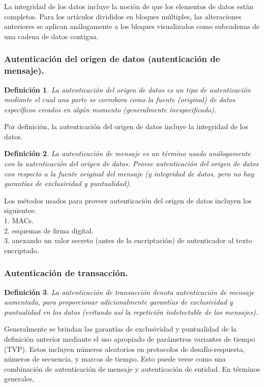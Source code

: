 \documentclass[a4paper, 12pt]{article} %
\newtheorem*{mydef1}{Definición} %
\begin{document}
La integridad de los datos incluye la noción de que los elementos de datos están completos. Para los artículos
divididos en bloques múltiples, las alteraciones anteriores se aplican análogamente a los bloques visualizados
como subcadenas de una cadena de datos contigua.

\subsubsection{Autenticación del origen de datos (autenticación de mensaje).}

\begin{mydef1}
La \textit{autenticación del origen de datos} es un tipo de autenticación mediante el cual una parte se corrobora
como la fuente (original) de datos específicos creados en algún momento (generalmente inespecificado).
\end{mydef1}

Por definición, la autenticación del origen de datos incluye la integridad de los datos.

\begin{mydef1}
La \textit{autenticación de mensaje} es un término usado análogamente con la autenticación del origen de datos.
Provee autenticación del origen de datos con respecto a la fuente original del mensaje (y integridad de datos,
pero no hay garantías de exclusividad y puntualidad).
\end{mydef1}

Los métodos usados para proveer autenticación del origen de datos incluyen los siguientes:\\
1. MACs.\\
2. esquemas de firma digital.\\
3. anexando un valor secreto (antes de la encriptación) de autenticador al texto encriptado.

\subsubsection{Autenticación de transacción.}

\begin{mydef1}
La \textit{autenticación de transacción} denota autenticación de mensaje aumentada, para proporcionar adicionalmente
garantías de exclusividad y puntualidad en los datos (evitando así la repetición indetectable de los mensajes).
\end{mydef1}

\newpage
Generalmente se brindan las garantías de exclusividad y puntualidad de la definición anterior mediante el uso
apropiado de parámetros variantes de tiempo (TVP). Estos incluyen números aleatorios en protocolos de
desafío-respuesta, números de secuencia, y marcas de tiempo. Esto puede verse como una combinación de autenticación
de mensaje y autenticación de entidad. En términos generales,
\end{document}
